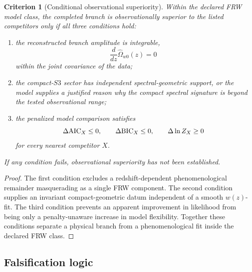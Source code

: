 \documentclass[11pt,a4paper]{article}
\def\Sthree{S3}%
\def\dd{d}%
\numberwithin{equation}{section}
\newtheorem{criterion}{Criterion}
\theoremstyle{remark}
\newcommand{\Sthree}{S^3}
\newcommand{\dd}{\mathrm{d}}
\begin{document}
\begin{criterion}[Conditional observational superiority]
Within the declared FRW model class, the completed branch is observationally superior to the listed competitors only if all three conditions hold:
\begin{enumerate}
\item the reconstructed branch amplitude is integrable,
\begin{equation}
\frac{\dd}{\dd z}\widehat{\Omega}_{w0}(z)=0
\end{equation}
within the joint covariance of the data;
\item the compact-\(\Sthree\) sector has independent spectral-geometric support, or the model supplies a justified reason why the compact spectral signature is beyond the tested observational range;
\item the penalized model comparison satisfies
\begin{equation}
\Delta{\rm AIC}_X\le0,
\qquad
\Delta{\rm BIC}_X\le0,
\qquad
\Delta\ln Z_X\ge0
\end{equation}
for every nearest competitor \(X\).
\end{enumerate}
If any condition fails, observational superiority has not been established.
\end{criterion}

\begin{proof}
The first condition excludes a redshift-dependent phenomenological remainder masquerading as a single FRW component. The second condition supplies an invariant compact-geometric datum independent of a smooth \(w(z)\)-fit. The third condition prevents an apparent improvement in likelihood from being only a penalty-unaware increase in model flexibility. Together these conditions separate a physical branch from a phenomenological fit inside the declared FRW class.
\end{proof}

\subsection{Falsification logic}
\end{document}
